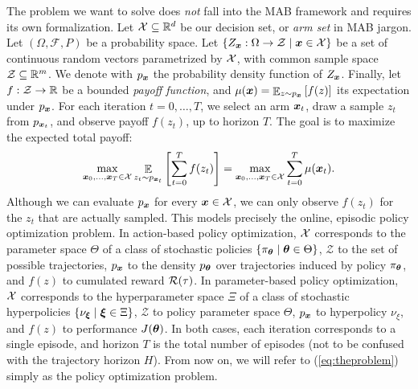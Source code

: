 \documentclass{article}
\begin{document}
The problem we want to solve does \textit{not} fall into the MAB framework and requires its own formalization. Let $\mathcal{X}\subseteq \mathbb{R}^d$ be our decision set, or \textit{arm set} in MAB jargon. Let $(\Omega,\mathcal{F},P)$ be a probability space. Let ${\{Z_{\boldsymbol{x}}:\Omega\to\mathcal{Z}\mid \boldsymbol{x}\in\mathcal{X}\}}$ be a set of continuous random vectors parametrized by $\mathcal{X}$, with common sample space ${\mathcal{Z}\subseteq \mathbb{R}^m}$. We denote with $p_{\boldsymbol{x}}$ the probability density function of $Z_{\boldsymbol{x}}$. Finally, let $f:\mathcal{Z}\to\mathbb{R}$ be a bounded \textit{payoff function}, and $\mu(\boldsymbol{x}) = \mathop{\mathbb{E}}_{z\sim p_{\boldsymbol{x}}}\left[f(z)\right]$ its expectation under $p_{\boldsymbol{x}}$. For each iteration $t=0,\dots,T$, we select an arm $\boldsymbol{x}_t$, draw a sample $z_t$ from $p_{\boldsymbol{x}_t}$, and observe payoff $f(z_t)$, up to horizon $T$. The goal is to maximize the expected total payoff:
\begin{align}\label{eq:theproblem}
	\max_{\boldsymbol{x}_0,\dots,\boldsymbol{x}_T\in\mathcal{X}} \mathop{\mathbb{E}}_{z_t\sim p_{\boldsymbol{x}_t}}\left[\sum_{t=0}^T f(z_t)\right] = \max_{\boldsymbol{x}_0,\dots,\boldsymbol{x}_T\in\mathcal{X}}\sum_{t=0}^{T}\mu(\boldsymbol{x}_t).
\end{align}
Although we can evaluate $p_{\boldsymbol{x}}$ for every $\boldsymbol{x}\in\mathcal{X}$, we can only observe $f(z_t)$ for the $z_t$ that are actually sampled. 
This models precisely the online, episodic policy optimization problem.
In action-based policy optimization, $\mathcal{X}$ corresponds to the parameter space $\Theta$ of a class of stochastic policies ${\{\pi_{\boldsymbol{\theta}}\mid\boldsymbol{\theta}\in\Theta\}}$, $\mathcal{Z}$ to the set of possible trajectories, $p_{\boldsymbol{x}}$ to the density $p_{\boldsymbol{\theta}}$ over trajectories induced by policy $\pi_{\boldsymbol{\theta}}$, and $f(z)$ to cumulated reward $\mathcal{R}(\tau)$. 
In parameter-based policy optimization, $\mathcal{X}$ corresponds to the hyperparameter space $\Xi$ of a class of stochastic hyperpolicies $\{\nu_{\boldsymbol{\xi}}\mid\boldsymbol{\xi}\in\Xi\}$, $\mathcal{Z}$ to policy parameter space $\Theta$, $p_{\boldsymbol{x}}$ to hyperpolicy $\nu_{\xi}$, and $f(z)$ to performance $J(\boldsymbol{\theta})$. In both cases, each iteration corresponds to a single episode, and horizon $T$ is the total number of episodes (not to be confused with the trajectory horizon $H$). From now on, we will refer to (\ref{eq:theproblem}) simply as the policy optimization problem.
\end{document}

